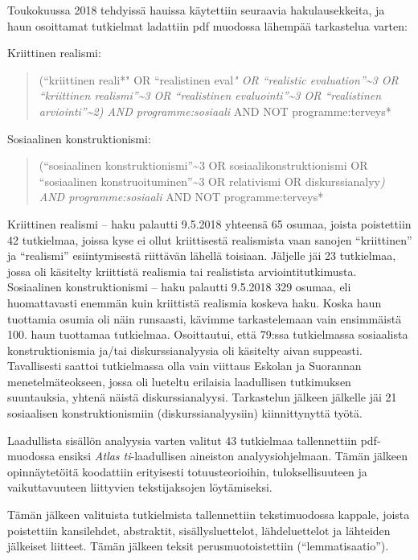 Toukokuussa 2018 tehdyissä hauissa käytettiin seuraavia hakulausekkeita,
ja haun osoittamat tutkielmat ladattiin pdf muodossa lähempää
tarkastelua varten:

Kriittinen realismi:

\begin{quote}
(``kriittinen reali*" OR ``realistinen eval\emph{" OR ``realistic
evaluation''\textasciitilde{}3 OR ``kriittinen
realismi''\textasciitilde{}3 OR ``realistinen
evaluointi''\textasciitilde{}3 OR ``realistinen
arviointi''\textasciitilde{}2) AND programme:sosiaali} AND NOT
programme:terveys*
\end{quote}

Sosiaalinen konstruktionismi:

\begin{quote}
(``sosiaalinen konstruktionismi''\textasciitilde{}3 OR
sosiaalikonstruktionismi OR ``sosiaalinen
konstruoituminen''\textasciitilde{}3 OR relativismi OR
diskurssianalyy\emph{) AND programme:sosiaali} AND NOT
programme:terveys*
\end{quote}

Kriittinen realismi -- haku palautti 9.5.2018 yhteensä 65 osumaa, joista
poistettiin 42 tutkielmaa, joissa kyse ei ollut kriittisestä realismista
vaan sanojen ``kriittinen'' ja ``realismi'' esiintymisestä riittävän
lähellä toisiaan. Jäljelle jäi 23 tutkielmaa, jossa oli käsitelty
kriittistä realismia tai realistista arviointitutkimusta. Sosiaalinen
konstruktionismi -- haku palautti 9.5.2018 329 osumaa, eli huomattavasti
enemmän kuin kriittistä realismia koskeva haku. Koska haun tuottamia
osumia oli näin runsaasti, kävimme tarkastelemaan vain ensimmäistä 100.
haun tuottamaa tutkielmaa. Osoittautui, että 79:ssa tutkielmassa
sosiaalista konstruktionismia ja/tai diskurssianalyysia oli käsitelty
aivan suppeasti. Tavallisesti saattoi tutkielmassa olla vain viittaus
Eskolan ja Suorannan menetelmäteokseen, jossa oli lueteltu erilaisia
laadullisen tutkimuksen suuntauksia, yhtenä näistä diskurssianalyysi.
Tarkastelun jälkeen jälkelle jäi 21 sosiaalisen konstruktionismiin
(diskurssianalyysiin) kiinnittynyttä työtä.

Laadullista sisällön analyysia varten valitut 43 tutkielmaa
tallennettiin pdf-muodossa ensiksi \emph{Atlas ti}-laadullisen aineiston
analyysiohjelmaan. Tämän jälkeen opinnäytetöitä koodattiin erityisesti
totuusteorioihin, tuloksellisuuteen ja vaikuttavuuteen liittyvien
tekstijaksojen löytämiseksi.

Tämän jälkeen valituista tutkielmista tallennettiin tekstimuodossa
kappale, joista poistettiin kansilehdet, abstraktit, sisällysluettelot,
lähdeluettelot ja lähteiden jälkeiset liitteet. Tämän jälkeen teksit
perusmuotoistettiin (``lemmatisaatio'').

